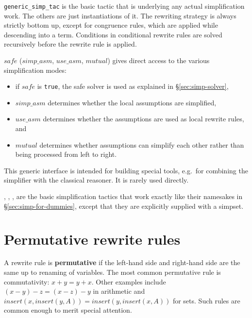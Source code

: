 \texttt{generic_simp_tac} is the basic tactic that is underlying any actual
simplification work. The others are just instantiations of it. The rewriting 
strategy is always strictly bottom up, except for congruence rules, 
which are applied while descending into a term.  Conditions in conditional 
rewrite rules are solved recursively before the rewrite rule is applied.

\begin{ttdescription}
  
\item[\ttindexbold{generic_simp_tac} $safe$ ($simp\_asm$, $use\_asm$, $mutual$)] 
  gives direct access to the various simplification modes: 
  \begin{itemize}
  \item if $safe$ is {\tt true}, the safe solver is used as explained in
  {\S}\ref{sec:simp-solver},  
  \item $simp\_asm$ determines whether the local assumptions are simplified,
  \item $use\_asm$ determines whether the assumptions are used as local rewrite 
   rules, and
  \item $mutual$ determines whether assumptions can simplify each other rather
  than being processed from left to right. 
  \end{itemize}
  This generic interface is intended 
  for building special tools, e.g.\ for combining the simplifier with the 
  classical reasoner. It is rarely used directly.
  
\item[\ttindexbold{simp_tac}, \ttindexbold{asm_simp_tac},
  \ttindexbold{full_simp_tac}, \ttindexbold{asm_full_simp_tac}] are
  the basic simplification tactics that work exactly like their
  namesakes in {\S}\ref{sec:simp-for-dummies}, except that they are
  explicitly supplied with a simpset.
  
\end{ttdescription}


\section{Permutative rewrite rules}

A rewrite rule is {\bf permutative} if the left-hand side and right-hand
side are the same up to renaming of variables.  The most common permutative
rule is commutativity: $x+y = y+x$.  Other examples include $(x-y)-z =
(x-z)-y$ in arithmetic and $insert(x,insert(y,A)) = insert(y,insert(x,A))$
for sets.  Such rules are common enough to merit special attention.

